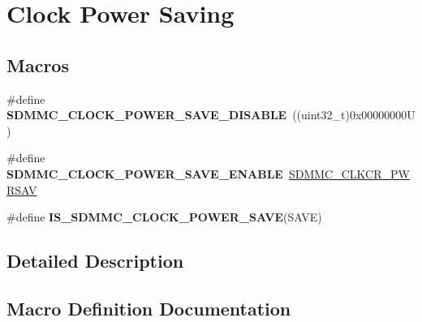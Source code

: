 \hypertarget{group___s_d_m_m_c___l_l___clock___power___save}{}\section{Clock Power Saving}
\label{group___s_d_m_m_c___l_l___clock___power___save}
\subsection*{Macros}
\begin{DoxyCompactItemize}
\item 
\mbox{\label{group___s_d_m_m_c___l_l___clock___power___save_ga9b01e94a0a34ddab98818791c3ecc923}} 
\#define {\bfseries S\+D\+M\+M\+C\+\_\+\+C\+L\+O\+C\+K\+\_\+\+P\+O\+W\+E\+R\+\_\+\+S\+A\+V\+E\+\_\+\+D\+I\+S\+A\+B\+LE}~((uint32\+\_\+t)0x00000000\+U)
\item 
\mbox{\label{group___s_d_m_m_c___l_l___clock___power___save_ga11439b5eb6b811fac7aa660b9567b895}} 
\#define {\bfseries S\+D\+M\+M\+C\+\_\+\+C\+L\+O\+C\+K\+\_\+\+P\+O\+W\+E\+R\+\_\+\+S\+A\+V\+E\+\_\+\+E\+N\+A\+B\+LE}~\mbox{\hyperlink{group___peripheral___registers___bits___definition_ga2f0786d18e491c195c762e38f745312d}{S\+D\+M\+M\+C\+\_\+\+C\+L\+K\+C\+R\+\_\+\+P\+W\+R\+S\+AV}}
\item 
\#define {\bfseries I\+S\+\_\+\+S\+D\+M\+M\+C\+\_\+\+C\+L\+O\+C\+K\+\_\+\+P\+O\+W\+E\+R\+\_\+\+S\+A\+VE}(S\+A\+VE)
\end{DoxyCompactItemize}


\subsection{Detailed Description}


\subsection{Macro Definition Documentation}
\mbox{\label{group___s_d_m_m_c___l_l___clock___power___save_gaa75cf0f0ad1ca20cfd32d2e26dbe495d}} 
